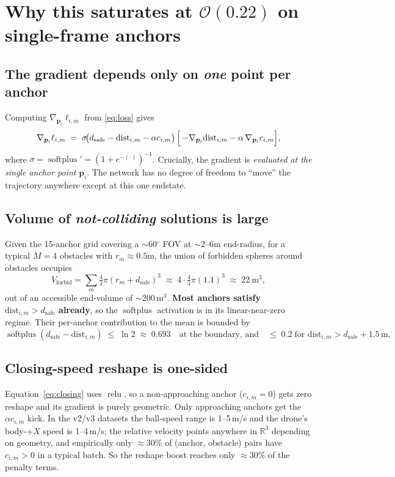 \documentclass[11pt]{article}
\newcommand{\R}{\mathbb{R}}
\newcommand{\relu}{\operatorname{relu}}
\newcommand{\softplus}{\operatorname{softplus}}
\begin{document}
\section{Why this saturates at $\mathcal{O}(0.22)$ on single-frame anchors}

\subsection{The gradient depends only on \emph{one} point per anchor}

Computing $\nabla_{\bm{p}_i} \ell_{i,m}$ from \eqref{eq:loss} gives
\begin{equation}\label{eq:grad}
\nabla_{\bm{p}_i} \ell_{i,m}
\;=\;
\sigma\!\bigl(d_{\text{safe}} - \mathrm{dist}_{i,m} - \alpha c_{i,m}\bigr)
\,\Bigl[\,
   -\nabla_{\bm{p}_i} \mathrm{dist}_{i,m}
   -\alpha\,\nabla_{\bm{p}_i} c_{i,m}
\Bigr],
\end{equation}
where $\sigma = \softplus' = (1 + e^{-(\cdot)})^{-1}$. Crucially, the gradient is
\emph{evaluated at the single anchor point} $\bm{p}_i$. The network has no degree
of freedom to ``move'' the trajectory anywhere except at this one endstate.

\subsection{Volume of \emph{not-colliding} solutions is large}

Given the 15-anchor grid covering a $\sim$60$^\circ$ FOV at $\sim$2--6m end-radius,
for a typical $M=4$ obstacles with $r_m \approx 0.5$m, the union of forbidden
spheres around obstacles occupies
\[
V_{\text{forbid}} = \sum_m \tfrac{4}{3}\pi(r_m + d_{\text{safe}})^3
\;\approx\; 4 \cdot \tfrac{4}{3}\pi(1.1)^3 \;\approx\; 22\ \text{m}^3,
\]
out of an accessible end-volume of $\sim$$200\,$m$^3$. \textbf{Most anchors
satisfy $\mathrm{dist}_{i,m} > d_{\text{safe}}$ already}, so the
$\softplus$ activation is in its linear-near-zero regime. Their per-anchor
contribution to the mean is bounded by
\[
\softplus(d_{\text{safe}} - \mathrm{dist}_{i,m})
\;\le\;
\ln 2 \;\approx\; 0.693
\quad \text{at the boundary, and} \quad
\le\; 0.2\;\text{for }\mathrm{dist}_{i,m} > d_{\text{safe}} + 1.5\,\text{m}.
\]

\subsection{Closing-speed reshape is one-sided}

Equation~\eqref{eq:closing} uses $\relu$, so a non-approaching anchor
($c_{i,m}=0$) gets zero reshape and its gradient is purely geometric. Only
approaching anchors get the $\alpha c_{i,m}$ kick. In the v2/v3 datasets the
ball-speed range is 1--5\,m/s and the drone's body-+$X$ speed is 1--4\,m/s;
the relative velocity points anywhere in $\R^3$ depending on geometry, and
empirically only $\approx 30\%$ of (anchor, obstacle) pairs have $c_{i,m} > 0$
in a typical batch. So the reshape boost reaches only $\approx 30\%$ of the
penalty terms.
\end{document}
